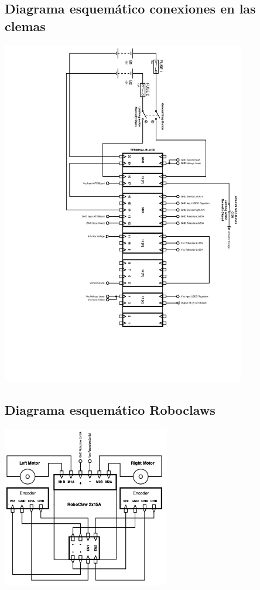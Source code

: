 \documentclass[user_manual.tex]{subfiles}
\begin{document}
\subsection{Diagrama esquemático conexiones en las clemas}

\begin{center}
\includegraphics[width=0.8\textwidth]{Figures/Hardware/Esquematicos/JustinaWiringDiagram.jpg}
\label{fig:Hardware:Partes:Diagrama:Esquematico:General}
\end{center}

\subsection{Diagrama esquemático Roboclaws}

\begin{center}
\includegraphics[width=0.55\textwidth]{Figures/Hardware/Esquematicos/Roboclaw_1.png}
\label{fig:Hardware:Partes:Diagrama:Esquematico:Roboclaw:1}
\end{center}
\end{document}
